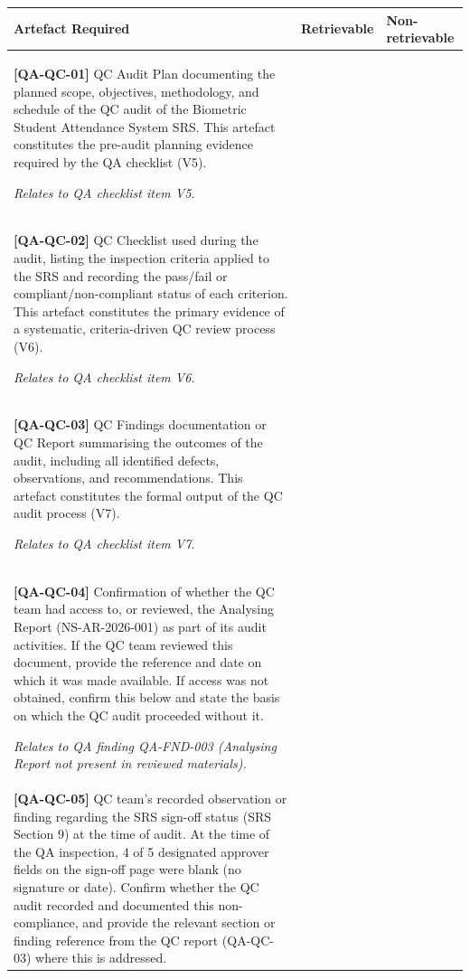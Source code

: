 \documentclass[11pt,a4paper]{article}
\newcommand{\checkbox}{\makebox[1em]{\Square}}
\begin{document}
\renewcommand{\arraystretch}{2.0}
\begin{longtable}{|p{}|p{}|p{}|}
\hline
\rowcolor{tableheader}
\textbf{Artefact Required} & \textbf{Retrievable} & \textbf{Non-retrievable} \\
\hline
\endhead

\rowcolor{medsev}
\small
\textbf{[QA-QC-01]} QC Audit Plan documenting the planned scope, objectives, methodology, and schedule of the QC audit of the Biometric Student Attendance System SRS. This artefact constitutes the pre-audit planning evidence required by the QA checklist (V5).

\textit{Relates to QA checklist item V5.} &
\centering\checkbox &
\centering\checkbox \tabularnewline
\hline

\rowcolor{medsev}
\small
\textbf{[QA-QC-02]} QC Checklist used during the audit, listing the inspection criteria applied to the SRS and recording the pass/fail or compliant/non-compliant status of each criterion. This artefact constitutes the primary evidence of a systematic, criteria-driven QC review process (V6).

\textit{Relates to QA checklist item V6.} &
\centering\checkbox &
\centering\checkbox \tabularnewline
\hline

\rowcolor{medsev}
\small
\textbf{[QA-QC-03]} QC Findings documentation or QC Report summarising the outcomes of the audit, including all identified defects, observations, and recommendations. This artefact constitutes the formal output of the QC audit process (V7).

\textit{Relates to QA checklist item V7.} &
\centering\checkbox &
\centering\checkbox \tabularnewline
\hline

\rowcolor{medsev}
\small
\textbf{[QA-QC-04]} Confirmation of whether the QC team had access to, or reviewed, the Analysing Report (NS-AR-2026-001) as part of its audit activities. If the QC team reviewed this document, provide the reference and date on which it was made available. If access was not obtained, confirm this below and state the basis on which the QC audit proceeded without it.

\textit{Relates to QA finding QA-FND-003 (Analysing Report not present in reviewed materials).} &
\centering\checkbox &
\centering\checkbox \tabularnewline
\hline

\rowcolor{highsev}
\small
\textbf{[QA-QC-05]} QC team's recorded observation or finding regarding the SRS sign-off status (SRS Section 9) at the time of audit. At the time of the QA inspection, 4 of 5 designated approver fields on the sign-off page were blank (no signature or date). Confirm whether the QC audit recorded and documented this non-compliance, and provide the relevant section or finding reference from the QC report (QA-QC-03) where this is addressed.


\end{longtable}
\end{document}

